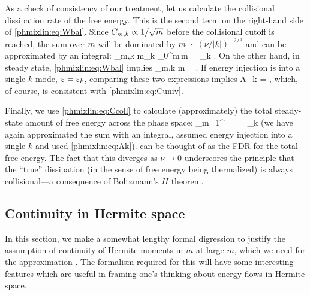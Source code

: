 As a check of consistency of our treatment, let us calculate 
the collisional dissipation rate of the free energy. 
This is the second term on the right-hand side of \eqref{phmixlin:eq:Wbal}. 
Since $C_{m,k}\propto1/\sqrt{m}$ before the collisional cutoff is reached, 
the sum over $m$ will be dominated by $m\sim(\nu/|k|)^{-2/3}$ 
and can be approximated by an integral: 
\beq
\nu\sum_{m,k} m\Cmk \approx \sum_k \nu\int_0^\infty\rmd m\,m\Cmk 
= \sum_k . 
\eeq
On the other hand, in steady state, \eqref{phmixlin:eq:Wbal} implies 
\beq
\nu\sum_{m,k} m\Cmk = \,\eps. \label{phmixlin:eq:Wbal_stst}
\eeq
If energy injection is into a single $k$ mode, $\varepsilon=\varepsilon_k$,  
comparing these two expressions implies 
\beq
A_k = , 
\label{phmixlin:eq:Ak}
\eeq
which, of course, is consistent with \eqref{phmixlin:eq:Cuniv}.

Finally, we use \eqref{phmixlin:eq:Ccoll} to calculate (approximately) 
the total steady-state amount of free energy across the phase space:
\beq
{}\sum_{m=1}^\infty \Cmk 
= 
= \,\eps_k
\label{phmixlin:eq:Wtot}
\eeq
(we have again approximated the sum with an integral, 
assumed energy injection into a single $k$ and used \eqref{phmixlin:eq:Ak}). 
 can be thought of as the FDR for the total free energy.  
The fact that this diverges as $\nu\to 0$ 
underscores the principle that the ``true'' dissipation (in the sense of free 
energy being thermalized) is always collisional---a consequence of Boltzmann's 
$H$ theorem.  

\subsection{Continuity in Hermite space}
\label{phmixlin:sec:cont}

In this section, we make a somewhat lengthy formal digression to 
justify the assumption of continuity of Hermite moments in $m$ at 
large $m$, which we need for the approximation . 
The formalism required for this will have some interesting features 
which are useful in framing one's thinking about energy flows in 
Hermite space. 

